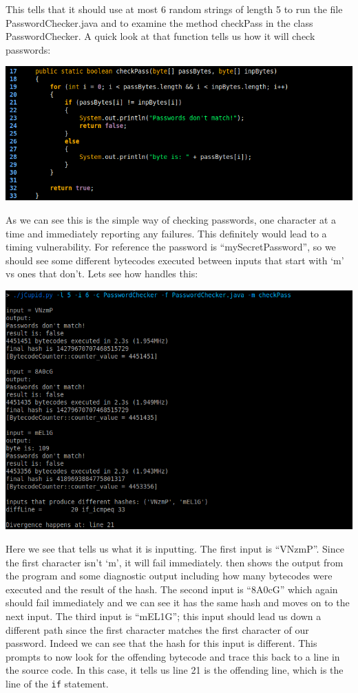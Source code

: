 This tells \jcupid that it should use at most 6 random strings of length 5 to run the file PasswordChecker.java
and to examine the method checkPass in the class PasswordChecker. A quick look at that function tells us how
it will check passwords:

\begin{center}
  \includegraphics[width=\linewidth]{PasswordChecker}
\end{center}

As we can see this is the simple way of checking passwords, one character at a time and immediately reporting
any failures. This definitely would lead to a timing vulnerability. For reference the password is 
``mySecretPassword'', so we should see some different bytecodes executed between inputs that start with `m'
vs ones that don't. Lets see how \jcupid handles this:

\begin{center}
  \includegraphics[width=\linewidth]{jCupidRun1}
\end{center}

Here we see that \jcupid tells us what it is inputting. The first input is ``VNzmP''. Since the first character
isn't `m', it will fail immediately. \jcupid then shows the output from the program and some
diagnostic output including how many bytecodes were executed and the result of the hash. The second input
is ``8A0cG'' which again should fail immediately and we can see it has the same hash and moves on to the
next input. The third input is ``mEL1G''; this input should lead us down a different path since the first
character matches the first character of our password. Indeed we can see that the hash for this input is
different. This prompts \jcupid to now look for the offending bytecode and trace this back to a line in 
the source code. In this case, it tells us line 21 is the offending line, which is the line of
the \texttt{if} statement.

